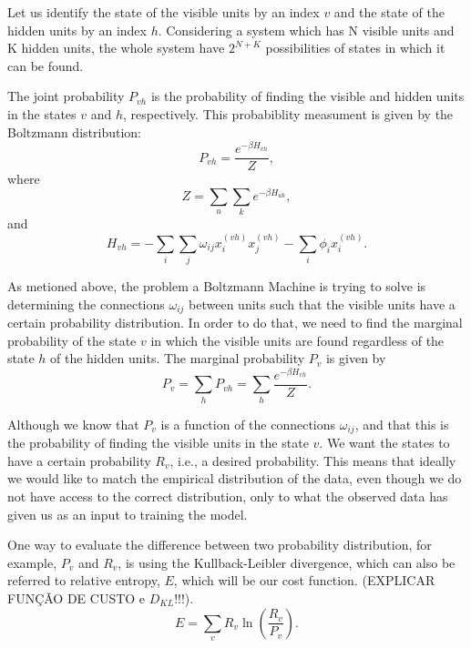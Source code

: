 Let us identify the state of the visible units by an index $v$ and the state of the hidden units by an index $h$.
Considering a system which has N visible units and K hidden units, the whole system have $2^{N + K}$ possibilities of states in which it can be found.

The joint probability $P_{vh}$ is the probability of finding the visible and hidden units in the states $v$ and $h$, respectively.
This probabiblity measument is given by the Boltzmann distribution:
\begin{equation}
  P_{vh} = \frac{e^{-\beta H_{vh}}}{Z},
  \label{eq:eq8}
\end{equation}
where
\begin{equation}
  Z = \sum_{u} \sum_{k} e^{-\beta H_{uk}},
  \label{eq:eq9}
\end{equation}
and
\begin{equation}
  H_{vh} = - \sum_{i} \sum_{j} \omega_{ij} x^{(vh)}_{i} x^{(vh)}_{j} - \sum_{i} \phi_{i} x^{(vh)}_{i}.
  \label{eq:eq10}
\end{equation}

As metioned above, the problem a Boltzmann Machine is trying to solve is determining the connections $\omega_{ij}$ between units such that the visible units have a certain probability distribution.
In order to do that, we need to find the marginal probability of the state $v$ in which the visible units are found regardless of the state $h$ of the hidden units. The marginal probability $P_{v}$ is given by
\begin{equation}
  P_{v} = \sum_{h} P_{vh} = \sum_{h} \frac{e^{-\beta H_{vh}}}{Z}.
  \label{eq:marginal_prob}
\end{equation}

Although we know that $P_{v}$ is a function of the connections $\omega_{ij}$, and that this is the probability of finding the visible units in the state $v$. We want the states to have a certain probability $R_{v}$, i.e., a desired probability.
This means that ideally we would like to match the empirical distribution of the data, even though we do not have access to the correct distribution, only to what the observed data has given us as an input to training the model.

One way to evaluate the difference between two probability distribution, for example, $P_{v}$ and $R_{v}$, is using the Kullback-Leibler divergence, which can also be referred to relative entropy, $E$, which will be our cost function.
(EXPLICAR FUN\c{C}\~{A}O DE CUSTO e $D_{KL}$!!!).
\begin{equation}
  E = \sum_{v} R_{v} \ln{\left(\frac{R_{v}}{P_{v}}\right)}.
  \label{eq:DKL}
\end{equation}

